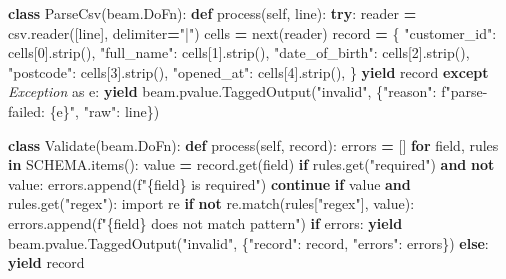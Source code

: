 \documentclass[
  11pt,
  british,
  oneside]{book}
\newenvironment{Shaded}{\begin{snugshade}}{\end{snugshade}}
\newcommand{\BuiltInTok}[1]{#1}
\newcommand{\ControlFlowTok}[1]{\textcolor[rgb]{0.13,0.29,0.53}{\textbf{#1}}}
\newcommand{\DecValTok}[1]{\textcolor[rgb]{0.00,0.00,0.81}{#1}}
\newcommand{\ImportTok}[1]{#1}
\newcommand{\KeywordTok}[1]{\textcolor[rgb]{0.13,0.29,0.53}{\textbf{#1}}}
\newcommand{\NormalTok}[1]{#1}
\newcommand{\OperatorTok}[1]{\textcolor[rgb]{0.81,0.36,0.00}{\textbf{#1}}}
\newcommand{\PreprocessorTok}[1]{\textcolor[rgb]{0.56,0.35,0.01}{\textit{#1}}}
\newcommand{\SpecialCharTok}[1]{\textcolor[rgb]{0.00,0.00,0.00}{#1}}
\newcommand{\SpecialStringTok}[1]{\textcolor[rgb]{0.31,0.60,0.02}{#1}}
\newcommand{\StringTok}[1]{\textcolor[rgb]{0.31,0.60,0.02}{#1}}
\newcommand{\VariableTok}[1]{\textcolor[rgb]{0.00,0.00,0.00}{#1}}
\begin{document}
\begin{Shaded}
\begin{Highlighting}[]
\KeywordTok{class}\NormalTok{ ParseCsv(beam.DoFn):}
    \KeywordTok{def}\NormalTok{ process(}\VariableTok{self}\NormalTok{, line):}
        \ControlFlowTok{try}\NormalTok{:}
\NormalTok{            reader }\OperatorTok{=}\NormalTok{ csv.reader([line], delimiter}\OperatorTok{=}\StringTok{"|"}\NormalTok{)}
\NormalTok{            cells }\OperatorTok{=} \BuiltInTok{next}\NormalTok{(reader)}
\NormalTok{            record }\OperatorTok{=}\NormalTok{ \{}
                \StringTok{"customer\_id"}\NormalTok{:   cells[}\DecValTok{0}\NormalTok{].strip(),}
                \StringTok{"full\_name"}\NormalTok{:     cells[}\DecValTok{1}\NormalTok{].strip(),}
                \StringTok{"date\_of\_birth"}\NormalTok{: cells[}\DecValTok{2}\NormalTok{].strip(),}
                \StringTok{"postcode"}\NormalTok{:      cells[}\DecValTok{3}\NormalTok{].strip(),}
                \StringTok{"opened\_at"}\NormalTok{:     cells[}\DecValTok{4}\NormalTok{].strip(),}
\NormalTok{            \}}
            \ControlFlowTok{yield}\NormalTok{ record}
        \ControlFlowTok{except} \PreprocessorTok{Exception} \ImportTok{as}\NormalTok{ e:}
            \ControlFlowTok{yield}\NormalTok{ beam.pvalue.TaggedOutput(}\StringTok{"invalid"}\NormalTok{,}
\NormalTok{                \{}\StringTok{"reason"}\NormalTok{: }\SpecialStringTok{f"parse{-}failed: }\SpecialCharTok{\{e\}}\SpecialStringTok{"}\NormalTok{, }\StringTok{"raw"}\NormalTok{: line\})}

\KeywordTok{class}\NormalTok{ Validate(beam.DoFn):}
    \KeywordTok{def}\NormalTok{ process(}\VariableTok{self}\NormalTok{, record):}
\NormalTok{        errors }\OperatorTok{=}\NormalTok{ []}
        \ControlFlowTok{for}\NormalTok{ field, rules }\KeywordTok{in}\NormalTok{ SCHEMA.items():}
\NormalTok{            value }\OperatorTok{=}\NormalTok{ record.get(field)}
            \ControlFlowTok{if}\NormalTok{ rules.get(}\StringTok{"required"}\NormalTok{) }\KeywordTok{and} \KeywordTok{not}\NormalTok{ value:}
\NormalTok{                errors.append(}\SpecialStringTok{f"}\SpecialCharTok{\{}\NormalTok{field}\SpecialCharTok{\}}\SpecialStringTok{ is required"}\NormalTok{)}
                \ControlFlowTok{continue}
            \ControlFlowTok{if}\NormalTok{ value }\KeywordTok{and}\NormalTok{ rules.get(}\StringTok{"regex"}\NormalTok{):}
                \ImportTok{import}\NormalTok{ re}
                \ControlFlowTok{if} \KeywordTok{not}\NormalTok{ re.match(rules[}\StringTok{"regex"}\NormalTok{], value):}
\NormalTok{                    errors.append(}\SpecialStringTok{f"}\SpecialCharTok{\{}\NormalTok{field}\SpecialCharTok{\}}\SpecialStringTok{ does not match pattern"}\NormalTok{)}
        \ControlFlowTok{if}\NormalTok{ errors:}
            \ControlFlowTok{yield}\NormalTok{ beam.pvalue.TaggedOutput(}\StringTok{"invalid"}\NormalTok{,}
\NormalTok{                \{}\StringTok{"record"}\NormalTok{: record, }\StringTok{"errors"}\NormalTok{: errors\})}
        \ControlFlowTok{else}\NormalTok{:}
            \ControlFlowTok{yield}\NormalTok{ record}


\end{Highlighting}
\end{Shaded}
\end{document}
